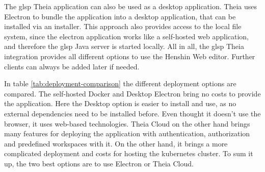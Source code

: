   The \ac{glsp} Theia application can also be used as a desktop application. Theia uses Electron \cite{electron-repo} to bundle the application into a desktop application, that can be installed via an installer. This approach also provides access to the local file system, since the electron application works like a self-hosted web application, and therefore the \ac{glsp} Java server is started locally. All in all, the \ac{glsp} Theia integration provides all different options to use the Henshin Web editor. Further clients can always be added later if needed.

  In table \ref{tab:deployment-comparison} the different deployment options are compared. The self-hosted Docker and Desktop Electron bring no costs to provide the application. Here the Desktop option is easier to install and use, as no external dependencies need to be installed before. Even thought it doesn't use the browser, it uses web-based technologies. Theia Cloud on the other hand brings many features for deploying the application with authentication, authorization and predefined workspaces with it. On the other hand, it brings a more complicated deployment and costs for hosting the kubernetes cluster. To sum it up, the two best options are to use Electron or Theia Cloud.



